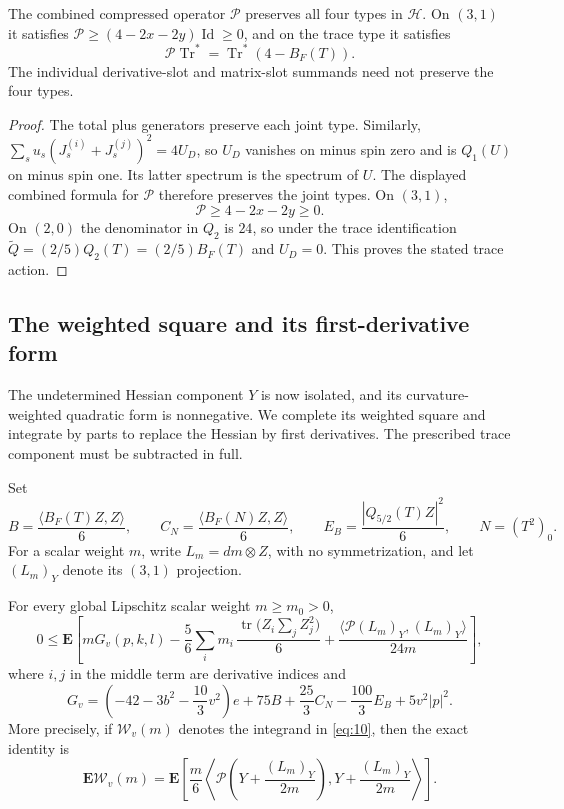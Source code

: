 \begin{lemma}
\label{lem:hessian-operator}
The combined compressed operator $\mathcal P$ preserves all four types
in $\mathcal H$. On $(3,1)$ it satisfies
$\mathcal P\ge(4-2x-2y)\operatorname{Id}\ge0$, and on the trace
type it satisfies
\[
 \mathcal P\operatorname{Tr}^*
   =\operatorname{Tr}^*(4-B_F(T)).
\]
The individual derivative-slot and matrix-slot summands need not preserve
the four types.
\end{lemma}

\begin{proof}
The total plus generators preserve each joint type. Similarly,
$\sum_su_s(J_s^{(i)}+J_s^{(j)})^2=4U_D$, so $U_D$ vanishes on minus
spin zero and is $Q_1(U)$ on minus spin one. Its latter spectrum is the
spectrum of $U$. The displayed combined formula for $\mathcal P$ therefore
preserves the joint types. On $(3,1)$,
\[
 \mathcal P\ge4-2x-2y\ge0.
\]
On $(2,0)$ the denominator in $Q_2$ is $24$, so under the trace
identification $\widetilde Q=(2/5)Q_2(T)=(2/5)B_F(T)$ and $U_D=0$.
This proves the stated trace action.
\end{proof}

\subsection{The weighted square and its first-derivative form}

The undetermined Hessian component $Y$ is now isolated, and its
curvature-weighted quadratic form is nonnegative. We complete its weighted
square and integrate by parts to replace the Hessian by first derivatives.
The prescribed trace component must be subtracted in full.

Set
\[
 B=\frac{\langle B_F(T)Z,Z\rangle}{6},\qquad
 C_N=\frac{\langle B_F(N)Z,Z\rangle}{6},\qquad
 E_B=\frac{|Q_{5/2}(T)Z|^2}{6},
 \qquad N=(T^2)_0.
\]
For a scalar weight \(m\), write \(L_m=dm\otimes Z\), with no
symmetrization, and let \((L_m)_Y\) denote its \((3,1)\) projection.

\begin{proposition}
\label{prop:weighted-hessian}
For every global Lipschitz scalar weight \mbox{$m\ge m_0>0$},
\begin{equation}
 0\le\mathbf E\left[
 mG_v(p,k,l)
 -\frac56\sum_i m_i\,
    \frac{\operatorname{tr}\bigl(Z_i\sum_jZ_j^2\bigr)}6
 +\frac{\langle\mathcal P(L_m)_Y,(L_m)_Y\rangle}{24m}
 \right],
 \tag{10}\label{eq:10}
\end{equation}
where \(i,j\) in the middle term are derivative indices and
\[
 G_v=\left(-42-3b^2-\frac{10}{3}v^2\right)e
       +75B+\frac{25}{3}C_N-\frac{100}{3}E_B
       +5v^2|p|^2.
\]
More precisely, if $\mathcal W_v(m)$ denotes the integrand in
\eqref{eq:10}, then the exact identity is
\begin{equation}
 \mathbf E\mathcal W_v(m)
 =\mathbf E\left[\frac m6\left\langle
 \mathcal P\left(Y+\frac{(L_m)_Y}{2m}\right),
               Y+\frac{(L_m)_Y}{2m}\right\rangle\right].
 \tag{10a}\label{eq:weighted-hessian-square}
\end{equation}
\end{proposition}

